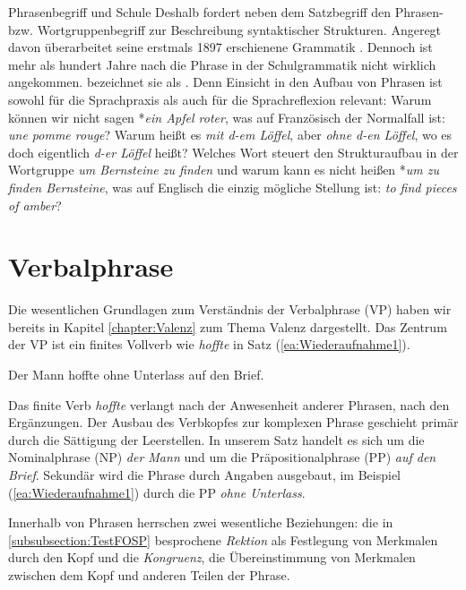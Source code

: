 \begin{Exkurs}{Phrasenbegriff und Schule}
\largerpage
Deshalb fordert \citet[10, 56--60]{Ries1894} neben dem Satzbegriff den Phrasen- bzw. Wortgruppenbegriff zur Beschreibung syntaktischer Strukturen. Angeregt davon überarbeitet \citet{Suetterlin1907} seine erstmals 1897 erschienene Grammatik . Dennoch ist mehr als hundert Jahre nach \citet{Ries1894} die Phrase in der Schulgrammatik nicht wirklich angekommen. \citet[10, 14]{Granzow-Emden2014} bezeichnet sie als . Denn Einsicht in den Aufbau von Phrasen ist sowohl für die Sprachpraxis als auch für die Sprachreflexion relevant: Warum können wir nicht sagen *\textit{ein Apfel roter}, was auf Französisch der Normalfall ist: \textit{une pomme rouge}? Warum heißt es \textit{mit d-em Löffel}, aber \textit{ohne d-en Löffel}, wo es doch eigentlich \textit{d-er Löffel} heißt? Welches Wort steuert den Strukturaufbau in der Wortgruppe \textit{um Bernsteine zu finden} und warum kann es nicht heißen *\textit{um zu finden Bernsteine}, was auf Englisch die einzig mögliche Stellung ist: \textit{to find pieces of amber}?    

\end{Exkurs}



\section{Verbalphrase}\label{section:VP}
\largerpage[2]
Die wesentlichen Grundlagen zum Verständnis der Verbalphrase (VP) haben wir bereits in Kapitel \ref{chapter:Valenz} zum Thema Valenz dargestellt. Das Zentrum der VP ist ein finites Vollverb wie \textit{hoffte} in Satz (\ref{ea:Wiederaufnahme1}).

\ea \label{ea:Wiederaufnahme1} Der Mann hoffte ohne Unterlass auf den Brief.
\z 

Das finite Verb \textit{hoffte} verlangt nach der Anwesenheit anderer Phrasen, nach den Ergänzungen. Der Ausbau des Verbkopfes zur komplexen Phrase geschieht primär durch die Sättigung der Leerstellen. In unserem Satz handelt es sich um die Nominalphrase (NP) \textit{der Mann} und um die Präpositionalphrase (PP) \textit{auf den Brief}. Sekundär wird die Phrase durch Angaben ausgebaut, im Beispiel (\ref{ea:Wiederaufnahme1}) durch die PP \textit{ohne Unterlass}. 

Innerhalb von Phrasen herrschen zwei wesentliche Beziehungen: die in \ref{subsubsection:TestFOSP} besprochene \textit{Rektion} als Festlegung von Merkmalen durch den Kopf und die \textit{Kongruenz}, die Übereinstimmung von Merkmalen zwischen dem Kopf und anderen Teilen der Phrase. 

